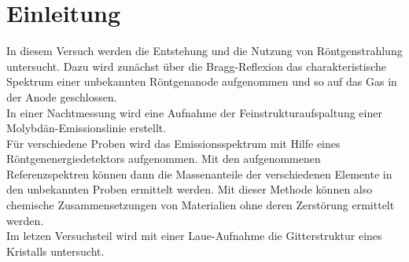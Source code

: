 \section{Einleitung}
In diesem Versuch werden die Entstehung und die Nutzung von Röntgenstrahlung untersucht. Dazu wird zunächst über die Bragg-Reflexion das charakteristische Spektrum einer unbekannten Röntgenanode aufgenommen und so auf das Gas in der Anode geschlossen. \\
In einer Nachtmessung wird eine Aufnahme der Feinstrukturaufspaltung einer Molybdän-Emissionslinie erstellt. \\
Für verschiedene Proben wird das Emissionsspektrum mit Hilfe eines Röntgenenergiedetektors aufgenommen. Mit den aufgenommenen Referenzspektren können dann die Massenanteile der verschiedenen Elemente in den unbekannten Proben ermittelt werden. Mit dieser Methode können also chemische Zusammensetzungen von Materialien ohne deren Zerstörung ermittelt werden. \\
Im letzen Versuchsteil wird mit einer Laue-Aufnahme die Gitterstruktur eines Kristalls untersucht. 
